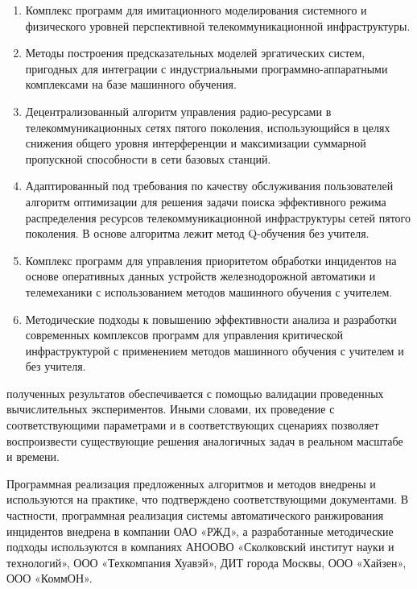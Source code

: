 {}
\begin{enumerate}
  \item Комплекс программ для имитационного моделирования системного и физического уровней перспективной телекоммуникационной инфраструктуры.
  \item Методы построения предсказательных моделей эргатических систем, пригодных для интеграции с индустриальными программно-аппаратными комплексами на базе машинного обучения.
  \item Децентрализованный алгоритм управления радио-ресурсами в телекоммуникационных сетях пятого поколения, использующийся в целях снижения общего уровня интерференции и максимизации суммарной пропускной способности в сети базовых станций.
  \item Адаптированный под требования по качеству обслуживания пользователей алгоритм оптимизации для решения задачи поиска эффективного режима распределения ресурсов телекоммуникационной инфраструктуры сетей пятого поколения. В основе алгоритма лежит метод Q-обучения без учителя.
  \item Комплекс программ для управления приоритетом обработки инцидентов на основе оперативных данных устройств железнодорожной автоматики и телемеханики с использованием методов машинного обучения с учителем.
  \item Методические подходы к повышению эффективности анализа и разработки современных комплексов программ для управления критической инфраструктурой с применением методов машинного обучения с учителем и без учителя.
\end{enumerate}

{\reliability} полученных результатов обеспечивается с помощью валидации проведенных вычислительных экспериментов. Иными словами, их проведение с соответствующими параметрами и в соответствующих сценариях позволяет воспроизвести существующие решения аналогичных задач в реальном масштабе и времени.




Программная реализация предложенных алгоритмов и методов внедрены  и используются на практике, что подтверждено соответствующими документами. В частности, программная реализация системы автоматического ранжирования инцидентов внедрена в компании ОАО «РЖД», а разработанные методические подходы используются в компаниях АНООВО «Сколковский институт науки и технологий», ООО «Техкомпания Хуавэй», ДИТ города Москвы, ООО «Хайзен», ООО «КоммОН».

